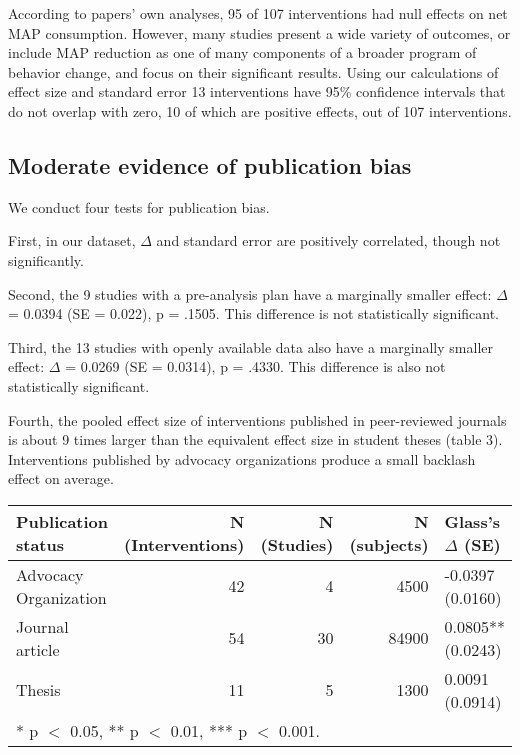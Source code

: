 \documentclass[sn-nature,pdflatex]{sn-jnl}
\begin{document}
According to papers' own analyses, 95 of 107 interventions had null
effects on net MAP consumption. However, many studies present a wide
variety of outcomes, or include MAP reduction as one of many components
of a broader program of behavior change, and focus on their significant
results. Using our calculations of effect size and standard error 13
interventions have 95\% confidence intervals that do not overlap with
zero, 10 of which are positive effects, out of 107 interventions.

\subsection{Moderate evidence of publication bias}\label{sec2.3}

We conduct four tests for publication bias.

\begin{comment} 
introductory remarks about how this puts our main results in one light or another? 
\end{comment}

First, in our dataset, \(\Delta\) and standard error are positively
correlated, though not significantly.

\begin{comment} 
good place for a figure?
\end{comment}

Second, the 9 studies with a pre-analysis plan have a marginally smaller
effect: \(\Delta\) = 0.0394 (SE = 0.022), p = .1505. This difference is
not statistically significant.

Third, the 13 studies with openly available data also have a marginally
smaller effect: \(\Delta\) = 0.0269 (SE = 0.0314), p = .4330. This
difference is also not statistically significant.

Fourth, the pooled effect size of interventions published in
peer-reviewed journals is about 9 times larger than the equivalent
effect size in student theses (table 3). Interventions published by
advocacy organizations produce a small backlash effect on average.

\begin{table}[!h]
\centering
\begin{tabular}{lrrrl}
\toprule
Publication status & N (Interventions) & N (Studies) & N (subjects) & Glass's $\Delta$ (SE)\\
\midrule
Advocacy Organization & 42 & 4 & 4500 & -0.0397 (0.0160)\\
Journal article & 54 & 30 & 84900 & 0.0805** (0.0243)\\
Thesis & 11 & 5 & 1300 & 0.0091 (0.0914)\\
\bottomrule
\multicolumn{5}{l}{\rule{0pt}{1em}* p $<$ 0.05, ** p $<$ 0.01, *** p $<$ 0.001.}\\
\end{tabular}
\end{table}
\end{document}
